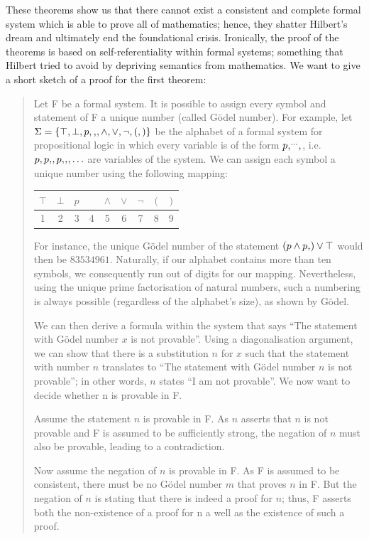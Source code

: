 \documentclass[hidelinks]{article}
\newcommand*\vtick{\textsc{\char13}}
\begin{document}
These theorems show us that there cannot exist a consistent and complete formal system which is able to prove all of mathematics; hence, they shatter Hilbert's dream and ultimately end the foundational crisis. Ironically, the proof of the theorems is based on self-referentiality within formal systems; something that Hilbert tried to avoid by depriving semantics from mathematics.
We want to give a short sketch of a proof for the first theorem:
\begin{quote}
Let F be a formal system. It is possible to assign every symbol and statement of F a unique number (called Gödel number). For example, let $\Sigma=\{\top,\bot,p,\vtick,\land,\lor,\lnot,(,)\}$ be the alphabet of a formal system for propositional logic in which every variable is of the form $p\vtick^{\ldots}\vtick$, i.e.\ $p,p\vtick,p\vtick\vtick,\ldots$ are variables of the system. We can assign each symbol a unique number using the following mapping:

\begin{center}
\begin{tabular}{| c | c | c | c | c | c | c | c | c |}
\hline $\top$ & $\bot$ & $p$ & \vtick & $\land$ & $\lor$ & $\lnot$ & $($ & $)$ \\
\hline 1 & 2 & 3 & 4 & 5 & 6 & 7 & 8 & 9\\
\hline
\end{tabular}
\end{center}
	For instance, the unique Gödel number of the statement $(p\land p\vtick)\lor \top$ would then be $83534961$. Naturally, if our alphabet contains more than ten symbols, we consequently run out of digits for our mapping. Nevertheless, using the unique prime factorisation of natural numbers, such a numbering is always possible (regardless of the alphabet's size), as shown by Gödel.\cite{goedel_incompleteness}

We can then derive a formula within the system that says ``The statement with Gödel number $x$ is not provable''. Using a diagonalisation argument, we can show that there is a substitution $n$ for $x$ such that the statement with number $n$ translates to ``The statement with Gödel number $n$ is not provable''; in other words, $n$ states ``I am not provable''. We now want to decide whether n is provable in F.

Assume the statement $n$ is provable in F. As $n$ asserts that $n$ is not provable and F is assumed to be sufficiently strong, the negation of $n$ must also be provable, leading to a contradiction.

Now assume the negation of $n$ is provable in F. As F is assumed to be consistent, there must be no Gödel number $m$ that proves $n$ in F. But the negation of $n$ is stating that there is indeed a proof for $n$; thus, F asserts both the non-existence of a proof for n a well as the existence of such a proof.
\end{quote}
\end{document}
